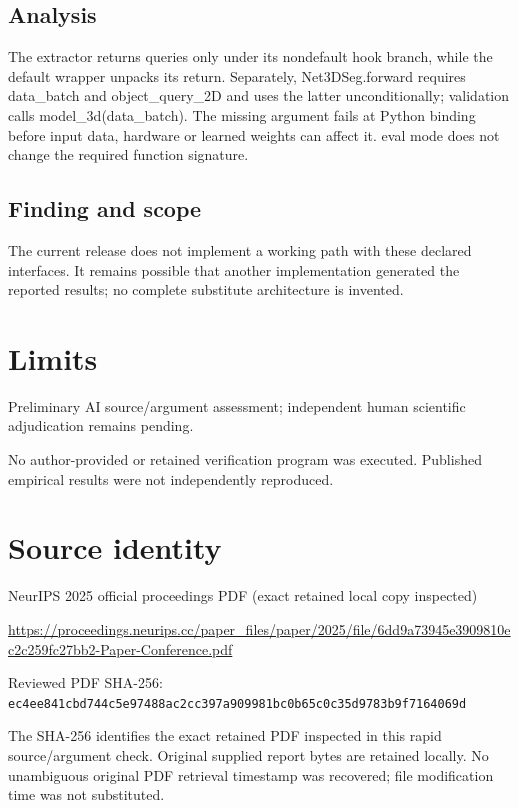 \documentclass[11pt]{article}
\begin{document}
\subsection*{Analysis}

The extractor returns queries only under its nondefault hook branch, while the default wrapper unpacks its return. Separately, Net3DSeg.forward requires data\_batch and object\_query\_2D and uses the latter unconditionally; validation calls model\_3d(data\_batch). The missing argument fails at Python binding before input data, hardware or learned weights can affect it. eval mode does not change the required function signature.

\subsection*{Finding and scope}

The current release does not implement a working path with these declared interfaces. It remains possible that another implementation generated the reported results; no complete substitute architecture is invented.

\section*{Limits}

Preliminary AI source/argument assessment; independent human scientific adjudication remains pending.\par

No author-provided or retained verification program was executed. Published empirical results were not independently reproduced.\par

\section*{Source identity}

NeurIPS 2025 official proceedings PDF (exact retained local copy inspected)

\url{https://proceedings.neurips.cc/paper_files/paper/2025/file/6dd9a73945e3909810ec2c259fc27bb2-Paper-Conference.pdf}

Reviewed PDF SHA-256: \nolinkurl{ec4ee841cbd744c5e97488ac2cc397a909981bc0b65c0c35d9783b9f7164069d}

The SHA-256 identifies the exact retained PDF inspected in this rapid source/argument check. Original supplied report bytes are retained locally. No unambiguous original PDF retrieval timestamp was recovered; file modification time was not substituted.
\end{document}
